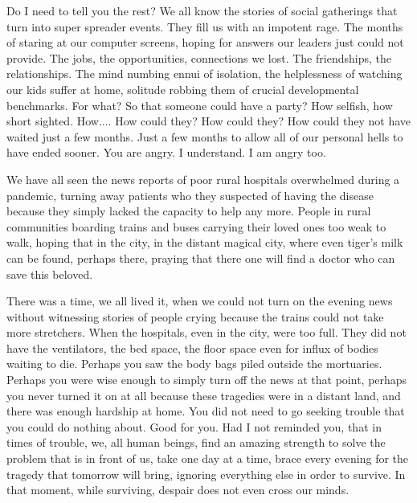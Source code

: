 \documentclass{amsart}
\newcommand{\egnote}{\todo[color=violet!30]}
\begin{document}
Do I need to tell you the rest? We all know the stories of social gatherings that turn into super spreader events. They fill us with an impotent rage. The months of staring at our computer screens, hoping for answers our leaders just could not provide. The jobs, the opportunities, connections we lost. The friendships, the relationships. The mind numbing ennui of isolation, the helplessness of watching our kids suffer at home, solitude robbing them of crucial developmental benchmarks. For what? So that someone could have a party? How selfish, how short sighted. How.... How could they? How could they? How could they not have waited just a few months. Just a few months to allow all of our personal hells to have ended sooner. You are angry. I understand. I am angry too. 

We have all seen the news reports of poor rural hospitals overwhelmed during a pandemic, turning away patients who they suspected of having the disease because they simply lacked the capacity to help any more. People in rural communities boarding trains and buses carrying their loved ones too weak to walk, hoping that in the city, in the distant magical city, where even tiger's milk can be found, perhaps there, praying that there one will find a doctor who can save this beloved. 

There was a time, we all lived it, when we could not turn on the evening news without witnessing stories of people crying because the trains could not take more stretchers. When the hospitals, even in the city, were too full. They did not have the ventilators, the bed space, the floor space even for \egnote{add `the'?} influx of bodies waiting to die. Perhaps you saw the body bags piled outside the mortuaries. Perhaps you were wise enough to simply turn off the news at that point, perhaps you never turned it on at all because these tragedies were in a distant land, and there was enough hardship at home. You did not need to go seeking trouble that you could do nothing about. Good for you. Had I not reminded you, that in times of trouble, we, all human beings, find an amazing strength to solve the problem that is in front of us, take one day at a time, brace every evening for the tragedy that tomorrow will bring, ignoring everything else in order to survive. In that moment, while surviving, despair does not even cross our minds.
\end{document}
